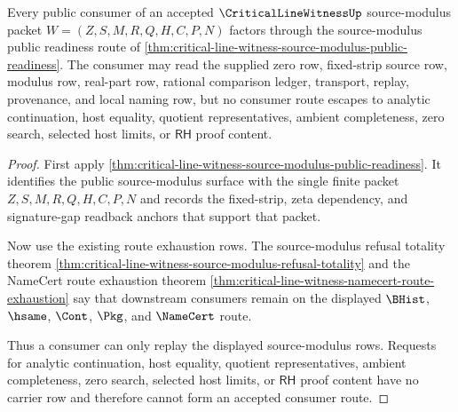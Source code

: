 \begin{theorem}
\label{thm:critical-line-witness-source-modulus-consumer-nonescape}
Every public consumer of an accepted $\CriticalLineWitnessUp$ source-modulus packet $W=(Z,S,M,R,Q,H,C,P,N)$ factors through the source-modulus public readiness route of \autoref{thm:critical-line-witness-source-modulus-public-readiness}. The consumer may read the supplied zero row, fixed-strip source row, modulus row, real-part row, rational comparison ledger, transport, replay, provenance, and local naming row, but no consumer route escapes to analytic continuation, host equality, quotient representatives, ambient completeness, zero search, selected host limits, or $\mathsf{RH}$ proof content.
\end{theorem}
\begin{proof}
First apply \autoref{thm:critical-line-witness-source-modulus-public-readiness}. It identifies the public source-modulus surface with the single finite packet $Z,S,M,R,Q,H,C,P,N$ and records the fixed-strip, zeta dependency, and signature-gap readback anchors that support that packet.

Now use the existing route exhaustion rows. The source-modulus refusal totality theorem \autoref{thm:critical-line-witness-source-modulus-refusal-totality} and the NameCert route exhaustion theorem \autoref{thm:critical-line-witness-namecert-route-exhaustion} say that downstream consumers remain on the displayed $\BHist$, $\hsame$, $\Cont$, $\Pkg$, and $\NameCert$ route.

Thus a consumer can only replay the displayed source-modulus rows. Requests for analytic continuation, host equality, quotient representatives, ambient completeness, zero search, selected host limits, or $\mathsf{RH}$ proof content have no carrier row and therefore cannot form an accepted consumer route.
\end{proof}

